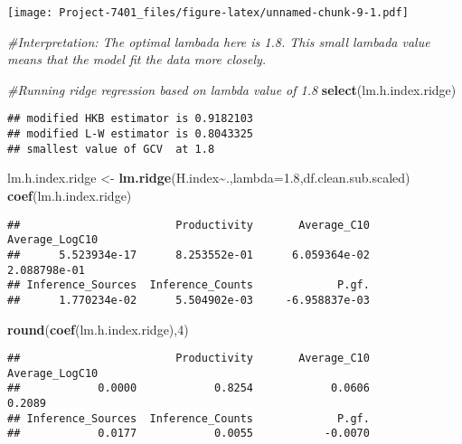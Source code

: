 \documentclass[
]{article}
\newenvironment{Shaded}{\begin{snugshade}}{\end{snugshade}}
\newcommand{\AttributeTok}[1]{\textcolor[rgb]{0.13,0.29,0.53}{#1}}
\newcommand{\CommentTok}[1]{\textcolor[rgb]{0.56,0.35,0.01}{\textit{#1}}}
\newcommand{\DecValTok}[1]{\textcolor[rgb]{0.00,0.00,0.81}{#1}}
\newcommand{\FloatTok}[1]{\textcolor[rgb]{0.00,0.00,0.81}{#1}}
\newcommand{\FunctionTok}[1]{\textcolor[rgb]{0.13,0.29,0.53}{\textbf{#1}}}
\newcommand{\NormalTok}[1]{#1}
\newcommand{\OtherTok}[1]{\textcolor[rgb]{0.56,0.35,0.01}{#1}}
\newcommand{\SpecialCharTok}[1]{\textcolor[rgb]{0.81,0.36,0.00}{\textbf{#1}}}
\begin{document}
\texttt{[image: Project-7401\_files/figure-latex/unnamed-chunk-9-1.pdf]}

\begin{Shaded}
\begin{Highlighting}[]
\CommentTok{\#Interpretation: The optimal lambada here is 1.8. This small lambada value means that the model fit the data more closely.}

\CommentTok{\#Running ridge regression based on lambda value of 1.8}
\FunctionTok{select}\NormalTok{(lm.h.index.ridge)}
\end{Highlighting}
\end{Shaded}

\begin{verbatim}
## modified HKB estimator is 0.9182103 
## modified L-W estimator is 0.8043325 
## smallest value of GCV  at 1.8
\end{verbatim}

\begin{Shaded}
\begin{Highlighting}[]
\NormalTok{lm.h.index.ridge }\OtherTok{\textless{}{-}} \FunctionTok{lm.ridge}\NormalTok{(H.index}\SpecialCharTok{\textasciitilde{}}\NormalTok{.,}\AttributeTok{lambda=}\FloatTok{1.8}\NormalTok{,df.clean.sub.scaled)}
\FunctionTok{coef}\NormalTok{(lm.h.index.ridge)}
\end{Highlighting}
\end{Shaded}

\begin{verbatim}
##                        Productivity       Average_C10    Average_LogC10 
##      5.523934e-17      8.253552e-01      6.059364e-02      2.088798e-01 
## Inference_Sources  Inference_Counts             P.gf. 
##      1.770234e-02      5.504902e-03     -6.958837e-03
\end{verbatim}

\begin{Shaded}
\begin{Highlighting}[]
\FunctionTok{round}\NormalTok{(}\FunctionTok{coef}\NormalTok{(lm.h.index.ridge),}\DecValTok{4}\NormalTok{)}
\end{Highlighting}
\end{Shaded}

\begin{verbatim}
##                        Productivity       Average_C10    Average_LogC10 
##            0.0000            0.8254            0.0606            0.2089 
## Inference_Sources  Inference_Counts             P.gf. 
##            0.0177            0.0055           -0.0070
\end{verbatim}
\end{document}

